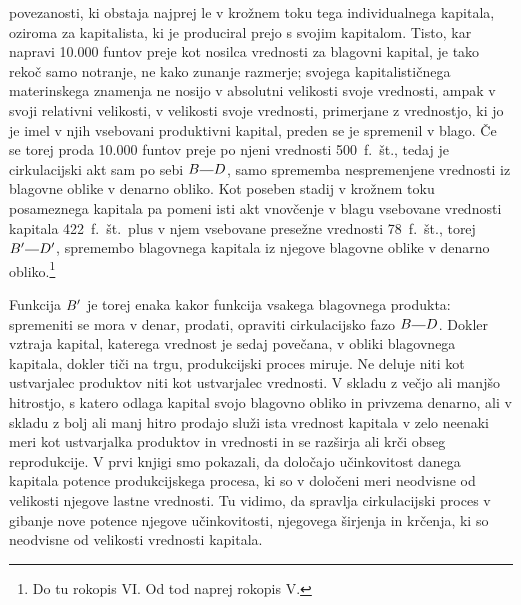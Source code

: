 \documentclass[kapital_02.tex]{subfiles}
\begin{document}
povezanosti, ki obstaja najprej le v krožnem toku tega individualnega kapitala, oziroma za kapitalista, ki je produciral prejo s svojim kapitalom. Tisto, kar napravi 10.000 funtov preje kot nosilca vrednosti za blagovni kapital, je tako rekoč samo notranje, ne kako zunanje razmerje; svojega kapitalističnega materinskega znamenja ne nosijo v absolutni velikosti svoje vrednosti, ampak v svoji relativni velikosti, v velikosti svoje vrednosti, primerjane z vrednostjo, ki jo je imel v njih vsebovani produktivni kapital, preden se je spremenil v blago. Če se torej proda 10.000 funtov preje po njeni vrednosti 500~f.~št., tedaj je cirkulacijski akt sam po sebi \(\KPEB\KPEcrta\KPED\), samo sprememba nespremenjene vrednosti iz blagovne oblike v denarno obliko. Kot poseben stadij v krožnem toku posameznega kapitala pa pomeni isti akt vnovčenje v blagu vsebovane vrednosti kapitala 422~f.~št.\ plus v njem vsebovane presežne vrednosti 78~f.~št., torej \(\KPEB'\KPEcrta\KPED'\), spremembo blagovnega kapitala iz njegove blagovne oblike v denarno obliko.\footnote{Do tu rokopis VI. Od tod naprej rokopis V.}

Funkcija \(B'\) je torej enaka kakor funkcija vsakega blagovnega produkta: spremeniti se mora v denar, prodati, opraviti cirkulacijsko fazo \(\KPEB\KPEcrta\KPED\). Dokler vztraja kapital, katerega vrednost je sedaj povečana, v obliki blagovnega kapitala, dokler tiči na trgu, produkcijski proces miruje. Ne deluje niti kot ustvarjalec produktov niti kot ustvarjalec vrednosti. V skladu z večjo ali manjšo hitrostjo, s katero odlaga kapital svojo blagovno obliko in privzema denarno, ali v skladu z bolj ali manj hitro prodajo služi ista vrednost kapitala v zelo neenaki meri kot ustvarjalka produktov in vrednosti in se razširja ali krči obseg reprodukcije. V prvi knjigi smo pokazali, da določajo učinkovitost danega kapitala potence produkcijskega procesa, ki so v določeni meri neodvisne od velikosti njegove lastne vrednosti. Tu vidimo, da spravlja cirkulacijski proces v gibanje nove potence njegove učinkovitosti, njegovega širjenja in krčenja, ki so neodvisne od velikosti vrednosti kapitala.
\end{document}
